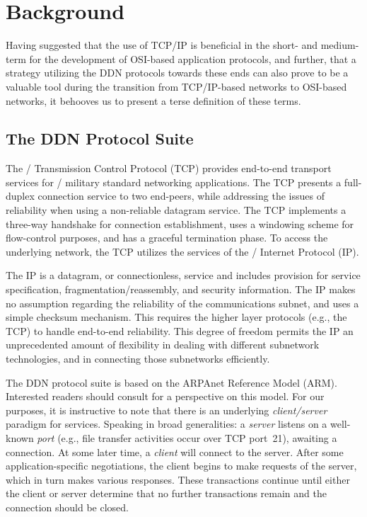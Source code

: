 
\section	{Background}
Having suggested that the use of TCP/IP is beneficial in the short- and
medium-term for the development of OSI-based application protocols,
and further,
that a strategy utilizing the DDN protocols towards these ends can also prove
to be a valuable tool during the transition from TCP/IP-based networks to
OSI-based networks,
it behooves us to present a terse definition of these terms.

\subsection	{The DDN Protocol Suite}
The \dod/ Transmission Control Protocol (TCP)\cite{TCP} provides
end-to-end transport services for \dod/ military standard networking
applications.
The TCP presents a full-duplex connection service to two end-peers,
while addressing the issues of reliability when using a non-reliable datagram
service.
The TCP implements a three-way handshake for connection establishment,
uses a windowing scheme for flow-control purposes,
and has a graceful termination phase.
To access the underlying network,
the TCP utilizes the services of the \dod/ Internet Protocol (IP)\cite{IP}.

The IP is a datagram, or connectionless, service and includes provision for
service specification, fragmentation/reassembly, and security information.
The IP makes no assumption regarding the reliability of the communications
subnet, and uses a simple checksum mechanism.
This requires the higher layer protocols (e.g., the TCP) to handle end-to-end
reliability.
This degree of freedom permits the IP an unprecedented amount of flexibility
in dealing with different subnetwork technologies,
and in connecting those subnetworks efficiently.

The DDN protocol suite is based on the ARPAnet Reference Model (ARM).
Interested readers should consult \cite{Internet.Architecture,ARM} for a
perspective on this model.
For our purposes,
it is instructive to note that there is an underlying {\em client/server\/}
paradigm for services.
Speaking in broad generalities:
a {\em server\/} listens on a well-known {\em port\/}
(e.g., file transfer activities occur over TCP port~21),
awaiting a connection.
At some later time,
a {\em client\/} will connect to the server.
After some application-specific negotiations,
the client begins to make requests of the server,
which in turn makes various responses.
These transactions
continue until either the client or server determine that no further
transactions remain and the connection should be closed.

